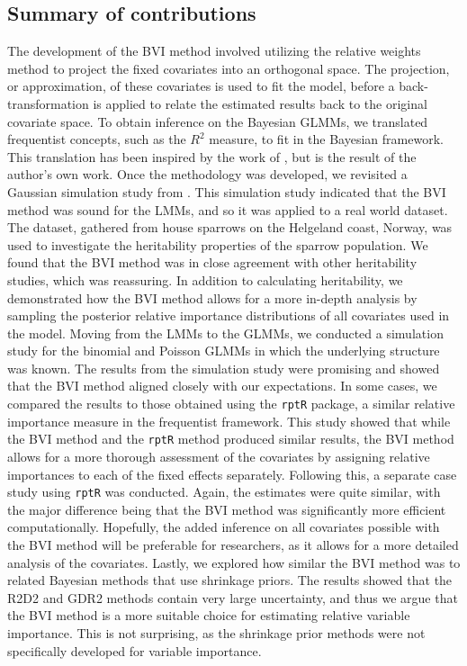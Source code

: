 \subsection*{Summary of contributions} 
The development of the BVI method involved utilizing the relative weights method \citep{johnson_relative_weights} to project the fixed covariates into an orthogonal space. The projection, or approximation, of these covariates is used to fit the model, before a back-transformation is applied to relate the estimated results back to the original covariate space. To obtain inference on the Bayesian GLMMs, we translated frequentist concepts, such as the $R^2$ measure, to fit in the Bayesian framework. This translation has been inspired by the work of \citet{gelman2017rsquared}, but is the result of the author's own work. Once the methodology was developed, we revisited a Gaussian simulation study from \citet{Arnstad:Relative_variable_importance_in_Bayesian_linear_mixed_models:2024}. This simulation study indicated that the BVI method was sound for the LMMs, and so it was applied to a real world dataset. The dataset, gathered from house sparrows on the Helgeland coast, Norway, was used to investigate the heritability properties of the sparrow population. We found that the BVI method was in close agreement with other heritability studies, which was reassuring. In addition to calculating heritability, we demonstrated how the BVI method allows for a more in-depth analysis by sampling the posterior relative importance distributions of all covariates used in the model. Moving from the LMMs to the GLMMs, we conducted a simulation study for the binomial and Poisson GLMMs in which the underlying structure was known. The results from the simulation study were promising and showed that the BVI method aligned closely with our expectations. In some cases, we compared the results to those obtained using the \texttt{rptR} package, a similar relative importance measure in the frequentist framework. This study showed that while the BVI method and the \texttt{rptR} method produced similar results, the BVI method allows for a more thorough assessment of the covariates by assigning relative importances to each of the fixed effects separately. Following this, a separate case study using \texttt{rptR} was conducted. Again, the estimates were quite similar, with the major difference being that the BVI method was significantly more efficient computationally. Hopefully, the added inference on all covariates possible with the BVI method will be preferable for researchers, as it allows for a more detailed analysis of the covariates. Lastly, we explored how similar the BVI method was to related Bayesian methods that use shrinkage priors. The results showed that the R2D2 and GDR2 methods contain very large uncertainty, and thus we argue that the BVI method is a more suitable choice for estimating relative variable importance. This is not surprising, as the shrinkage prior methods were not specifically developed for variable importance. 
